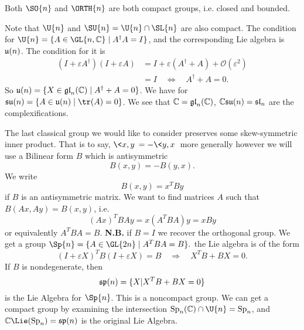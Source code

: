 \begin{rmk}
Both $\SO{n}$ and $\ORTH{n}$ are both compact groups, i.e. closed
and bounded.
\end{rmk}
\begin{rmk}
Note that $\U{n}$ and $\SU{n}=\U{n}\cap\SL{n}$ are also
compact. The condition for $\U{n}=\{A\in\GL{n,\Bbb{C}}\mid
A^{\dagger}A=I\}$, and the corresponding Lie algebra is
$\frak{u}(n)$. The condition for it is
\begin{subequations}
\begin{align}
(I+\varepsilon A^{\dagger})(I+\varepsilon A)&=I+\varepsilon(A^{\dagger}+A)+\mathcal{O}(\varepsilon^{2})\\
&=I\quad\iff\quad A^{\dagger}+A=0.
\end{align}
\end{subequations}
So $\frak{u}(n)=\{X\in\frak{gl}_{n}(\Bbb{C})\mid
A^{\dagger}+A=0\}$. We have for
$\frak{su}(n)=\{A\in\frak{u}(n)\mid \tr(A)=0\}$. We see that
$\Bbb{C}=\frak{gl}_{n}(\Bbb{C})$,
$\Bbb{C}\frak{su}(n)=\frak{sl}_{n}$ are the complexifications.
\end{rmk}

The last classical group we would like to consider preserves some
skew-symmetric inner product. That is to say, $\<x,y\>=-\<y,x\>$
more generally however we will use a Bilinear form $B$ which is
antisymmetric
\begin{equation}
B(x,y)=-B(y,x).
\end{equation}
We write
\begin{equation}
B(x,y)=x^{T}By
\end{equation}
if $B$ is an antisymmetric matrix. We want to find matrices $A$
such that $B(Ax,Ay)=B(x,y)$, i.e.
\begin{equation}
(Ax)^{T}BAy=x(A^{T}BA)y=xBy
\end{equation}
or equivalently $A^{T}BA=B$. {\bf N.B.} if $B=I$ we recover the
orthogonal group. We get a group $\Sp{n}=\{A\in\GL{2n}\mid
A^{T}BA=B\}.$ the Lie algebra is of the form
\begin{equation}
(I+\varepsilon X)^{T}B(I+\varepsilon X)=B\quad\Rightarrow\quad X^{T}B+BX=0.
\end{equation}
If $B$ is nondegenerate, then 
\begin{equation}
\frak{sp}(n)=\{X|X^{T}B+BX=0\}
\end{equation}
is the Lie Algebra for $\Sp{n}$. This is a noncompact group. We
can get a compact group by examining the intersection ${\rm
  Sp}_{n}(\Bbb{C})\cap\U{n}={\rm Sp}_{n}$, and $\Bbb{C}\Lie({\rm
  Sp}_{n})=\frak{sp}(n)$ is the original Lie Algebra.

